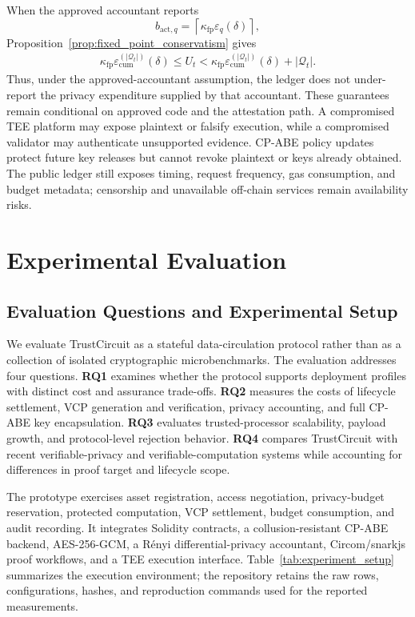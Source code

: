 \documentclass[10pt,journal,compsoc]{IEEEtran}
\begin{document}
When the approved accountant reports
\[
b_{\mathrm{act},q}
=
\left\lceil
\kappa_{\mathrm{fp}}\varepsilon_q(\delta)
\right\rceil,
\]
Proposition~\ref{prop:fixed_point_conservatism} gives
\begin{equation}
\begin{aligned}
\kappa_{\mathrm{fp}}
\varepsilon_{\mathrm{cum}}^{(|\mathcal{Q}_t|)}(\delta)
\leq U_t
<
\kappa_{\mathrm{fp}}
\varepsilon_{\mathrm{cum}}^{(|\mathcal{Q}_t|)}(\delta)
+
|\mathcal{Q}_t|.
\end{aligned}
\label{eq:end_to_end_budget_bound}
\end{equation}
Thus, under the approved-accountant assumption, the ledger does not under-report the privacy expenditure supplied by that accountant. These guarantees remain conditional on approved code and the attestation path. A compromised TEE platform may expose plaintext or falsify execution, while a compromised validator may authenticate unsupported evidence. CP-ABE policy updates protect future key releases but cannot revoke plaintext or keys already obtained. The public ledger still exposes timing, request frequency, gas consumption, and budget metadata; censorship and unavailable off-chain services remain availability risks.
\section{Experimental Evaluation}\label{sec:evaluation}

\subsection{Evaluation Questions and Experimental Setup}
\label{subsec:impl}

We evaluate TrustCircuit as a stateful data-circulation protocol rather than as a collection of isolated cryptographic microbenchmarks. The evaluation addresses four questions. \textbf{RQ1} examines whether the protocol supports deployment profiles with distinct cost and assurance trade-offs. \textbf{RQ2} measures the costs of lifecycle settlement, VCP generation and verification, privacy accounting, and full CP-ABE key encapsulation. \textbf{RQ3} evaluates trusted-processor scalability, payload growth, and protocol-level rejection behavior. \textbf{RQ4} compares TrustCircuit with recent verifiable-privacy and verifiable-computation systems while accounting for differences in proof target and lifecycle scope.

The prototype exercises asset registration, access negotiation, privacy-budget reservation, protected computation, VCP settlement, budget consumption, and audit recording. It integrates Solidity contracts, a collusion-resistant CP-ABE backend, AES-256-GCM, a R\'enyi differential-privacy accountant, Circom/snarkjs proof workflows, and a TEE execution interface. Table~\ref{tab:experiment_setup} summarizes the execution environment; the repository retains the raw rows, configurations, hashes, and reproduction commands used for the reported measurements.
\end{document}
